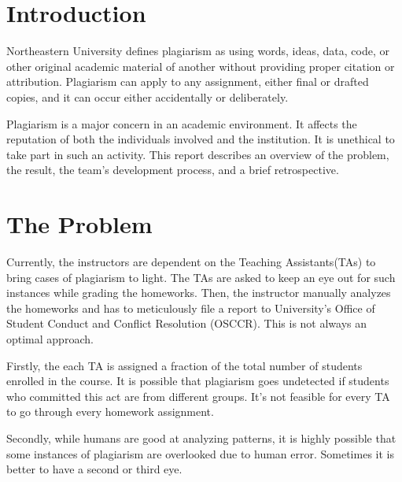 \documentclass[12pt]{article}
\begin{document}

\tableofcontents
\pagebreak


\section{Introduction}
\par Northeastern University defines plagiarism as using words, ideas, data, code, or other original academic material of another without providing proper citation or attribution. Plagiarism can apply to any assignment, either final or drafted copies, and it can occur either accidentally or deliberately. 

\par Plagiarism is a major concern in an academic environment. It affects the reputation of both the individuals involved and the institution. It is unethical to take part in such an activity. This report describes an overview of the problem, the result, the team's development process, and a brief retrospective. 

\section{The Problem}
\par Currently, the instructors are dependent on the Teaching Assistants(TAs) to bring cases of plagiarism to light. The TAs are asked to keep an eye out for such instances while grading the homeworks. Then, the instructor manually analyzes the homeworks and has to meticulously file a report to University's Office of Student Conduct and Conflict Resolution (OSCCR). This is not always an optimal approach. 

\par Firstly, the each TA is assigned a fraction of the total number of students enrolled in the course. It is possible that plagiarism goes undetected if students who committed this act are from different groups. It's not feasible for every TA to go through every homework assignment. 

\par Secondly, while humans are good at analyzing patterns, it is highly possible that some instances of plagiarism are overlooked due to human error. Sometimes it is better to have a second or third eye. 
\end{document}
